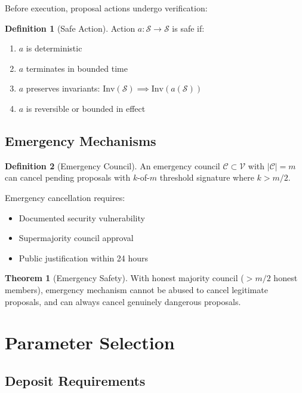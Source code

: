 \documentclass[11pt,a4paper]{article}
\theoremstyle{definition}
\newtheorem{definition}{Definition}[section]
\newtheorem{theorem}{Theorem}[section]
\theoremstyle{remark}
\begin{document}
Before execution, proposal actions undergo verification:

\begin{definition}[Safe Action]
Action $a: \mathcal{S} \to \mathcal{S}$ is safe if:
\begin{enumerate}
    \item $a$ is deterministic
    \item $a$ terminates in bounded time
    \item $a$ preserves invariants: $\text{Inv}(\mathcal{S}) \implies \text{Inv}(a(\mathcal{S}))$
    \item $a$ is reversible or bounded in effect
\end{enumerate}
\end{definition}

\subsection{Emergency Mechanisms}

\begin{definition}[Emergency Council]
An emergency council $\mathcal{C} \subset \mathcal{V}$ with $|\mathcal{C}| = m$ can cancel pending proposals with $k$-of-$m$ threshold signature where $k > m/2$.
\end{definition}

Emergency cancellation requires:
\begin{itemize}
    \item Documented security vulnerability
    \item Supermajority council approval
    \item Public justification within 24 hours
\end{itemize}

\begin{theorem}[Emergency Safety]
With honest majority council ($> m/2$ honest members), emergency mechanism cannot be abused to cancel legitimate proposals, and can always cancel genuinely dangerous proposals.
\end{theorem}

\section{Parameter Selection}

\subsection{Deposit Requirements}
\end{document}
